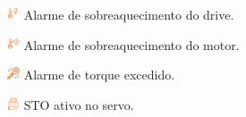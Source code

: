 \begin{unityAlarmIcons}

\item[\ding{\dingNumber}] \includegraphics[height=1em]{src/imagesICV/13-alarmsScreen/overview/drive-overtemperature-light-orange.png} Alarme de sobreaquecimento do drive.
\item[\ding{\dingNumber}] \includegraphics[height=1em]{src/imagesICV/13-alarmsScreen/overview/motor-overtemperature-orange.png} Alarme de sobreaquecimento do motor.
\item[\ding{\dingNumber}] \includegraphics[height=1em]{src/imagesICV/13-alarmsScreen/overview/torque-wrench-orange.png} Alarme de torque excedido.
\item[\ding{\dingNumber}] \includegraphics[height=1em]{src/imagesICV/13-alarmsScreen/overview/helmet-orange.png} STO ativo no servo.

\end{unityAlarmIcons}










